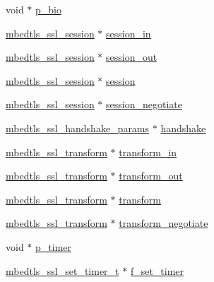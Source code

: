 \begin{DoxyCompactItemize}
\item 
void $\ast$ \mbox{\hyperlink{structmbedtls__ssl__context_aec081479009cd17997795d6eedf2c641}{p\+\_\+bio}}
\item 
\mbox{\hyperlink{structmbedtls__ssl__session}{mbedtls\+\_\+ssl\+\_\+session}} $\ast$ \mbox{\hyperlink{structmbedtls__ssl__context_a1a54dc6c582580371e94af230077dec1}{session\+\_\+in}}
\item 
\mbox{\hyperlink{structmbedtls__ssl__session}{mbedtls\+\_\+ssl\+\_\+session}} $\ast$ \mbox{\hyperlink{structmbedtls__ssl__context_a9009145707b10147eb41df26eca9629c}{session\+\_\+out}}
\item 
\mbox{\hyperlink{structmbedtls__ssl__session}{mbedtls\+\_\+ssl\+\_\+session}} $\ast$ \mbox{\hyperlink{structmbedtls__ssl__context_a2fc6ea9a1b644ee70bada085f89e3746}{session}}
\item 
\mbox{\hyperlink{structmbedtls__ssl__session}{mbedtls\+\_\+ssl\+\_\+session}} $\ast$ \mbox{\hyperlink{structmbedtls__ssl__context_a73ef7682bfa0827d71b5788c5724e718}{session\+\_\+negotiate}}
\item 
\mbox{\hyperlink{structmbedtls__ssl__handshake__params}{mbedtls\+\_\+ssl\+\_\+handshake\+\_\+params}} $\ast$ \mbox{\hyperlink{structmbedtls__ssl__context_aca0569b7d5c02f79c47fdc964dcc7309}{handshake}}
\item 
\mbox{\hyperlink{structmbedtls__ssl__transform}{mbedtls\+\_\+ssl\+\_\+transform}} $\ast$ \mbox{\hyperlink{structmbedtls__ssl__context_ac7ca7e3d2ee75a1d38f6dc8014c789d1}{transform\+\_\+in}}
\item 
\mbox{\hyperlink{structmbedtls__ssl__transform}{mbedtls\+\_\+ssl\+\_\+transform}} $\ast$ \mbox{\hyperlink{structmbedtls__ssl__context_a06e77983fa7ce4de0ffcd9ae8a038cdf}{transform\+\_\+out}}
\item 
\mbox{\hyperlink{structmbedtls__ssl__transform}{mbedtls\+\_\+ssl\+\_\+transform}} $\ast$ \mbox{\hyperlink{structmbedtls__ssl__context_a501f615c5b6da6b21f666e913e96f343}{transform}}
\item 
\mbox{\hyperlink{structmbedtls__ssl__transform}{mbedtls\+\_\+ssl\+\_\+transform}} $\ast$ \mbox{\hyperlink{structmbedtls__ssl__context_adce09e981f24eb615a5450194750deb7}{transform\+\_\+negotiate}}
\item 
void $\ast$ \mbox{\hyperlink{structmbedtls__ssl__context_ae6aa3c32c60b630754aa03c6aab6a1b7}{p\+\_\+timer}}
\item 
\mbox{\hyperlink{ssl_8h_a61c5d9ed63c50ee809eec98820d3f36c}{mbedtls\+\_\+ssl\+\_\+set\+\_\+timer\+\_\+t}} $\ast$ \mbox{\hyperlink{structmbedtls__ssl__context_a1dd74017666428c62af5e05e46f0f8f1}{f\+\_\+set\+\_\+timer}}

\end{DoxyCompactItemize}
